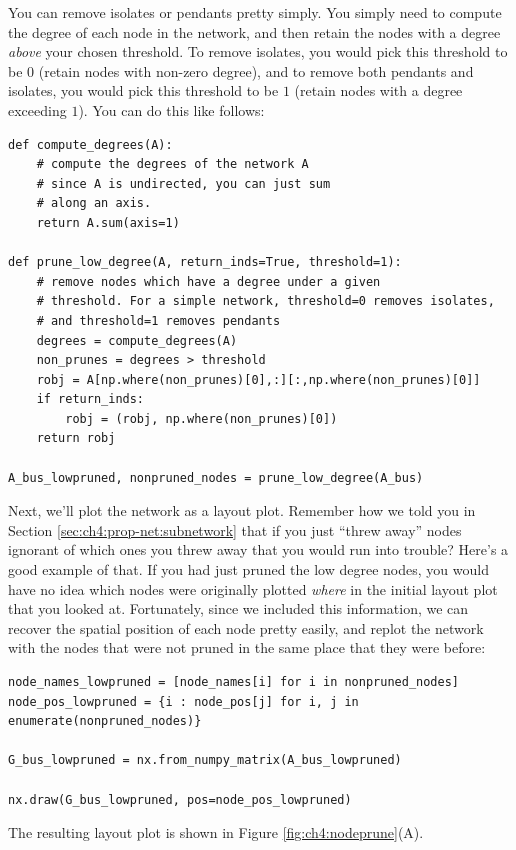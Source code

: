 You can remove isolates or pendants pretty simply. You simply need to compute the degree of each node in the network, and then retain the nodes with a degree \emph{above} your chosen threshold. To remove isolates, you would pick this threshold to be $0$ (retain nodes with non-zero degree), and to remove both pendants and isolates, you would pick this threshold to be $1$ (retain nodes with a degree exceeding $1$). You can do this like follows:
\begin{lstlisting}[style=python]
def compute_degrees(A):
    # compute the degrees of the network A
    # since A is undirected, you can just sum
    # along an axis.
    return A.sum(axis=1)

def prune_low_degree(A, return_inds=True, threshold=1):
    # remove nodes which have a degree under a given
    # threshold. For a simple network, threshold=0 removes isolates,
    # and threshold=1 removes pendants
    degrees = compute_degrees(A)
    non_prunes = degrees > threshold
    robj = A[np.where(non_prunes)[0],:][:,np.where(non_prunes)[0]]
    if return_inds:
        robj = (robj, np.where(non_prunes)[0])
    return robj

A_bus_lowpruned, nonpruned_nodes = prune_low_degree(A_bus)
\end{lstlisting}

Next, we'll plot the network as a layout plot. Remember how we told you in Section \ref{sec:ch4:prop-net:subnetwork} that if you just ``threw away'' nodes ignorant of which ones you threw away that you would run into trouble? Here's a good example of that. If you had just pruned the low degree nodes, you would have no idea which nodes were originally plotted \emph{where} in the initial layout plot that you looked at. Fortunately, since we included this information, we can recover the spatial position of each node pretty easily, and replot the network with the nodes that were not pruned in the same place that they were before:

\begin{lstlisting}[style=python]
node_names_lowpruned = [node_names[i] for i in nonpruned_nodes]
node_pos_lowpruned = {i : node_pos[j] for i, j in enumerate(nonpruned_nodes)}

G_bus_lowpruned = nx.from_numpy_matrix(A_bus_lowpruned)

nx.draw(G_bus_lowpruned, pos=node_pos_lowpruned)
\end{lstlisting}

The resulting layout plot is shown in Figure \ref{fig:ch4:nodeprune}(A).

